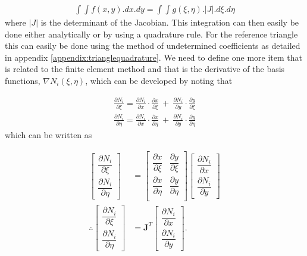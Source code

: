 \documentclass[11pt,letterpaper,titlepage]{article}
\newcommand{\beq}{\begin{equation*}
\begin{aligned}}
\newcommand{\eeq}{\end{aligned}
\end{equation*}}
\begin{document}
\beq 
\int \int f(x,y) .dx.dy = \int \int g (\xi,\eta).|J|.d\xi.d\eta
\eeq 
\newline
where $|J|$ is the determinant of the Jacobian. This integration can then easily be done either analytically or by using a quadrature rule. For the reference triangle this can easily be done using the method of undetermined coefficients as detailed in appendix \ref{appendix:trianglequadrature}.
\newline
\newline 
We need to define one more item that is related to the finite element method and that is the derivative of the basis functions, $\nabla N_i(\xi,\eta)$, which can be developed by noting that

\beq 
\frac{\partial N_i}{\partial \xi} = 
\frac{\partial N_i}{\partial x}\cdot \frac{\partial x}{\partial \xi} \ + \ 
\frac{\partial N_i}{\partial y}\cdot  \frac{\partial y}{\partial \xi}
\eeq 
\beq 
\frac{\partial N_i}{\partial \eta} = 
\frac{\partial N_i}{\partial x}\cdot \frac{\partial x}{\partial \eta} \ + \ 
\frac{\partial N_i}{\partial y}\cdot  \frac{\partial y}{\partial \eta}
\eeq 
\newline
which can be written as

\begingroup
\renewcommand*{\arraystretch}{1.5}
\beq
\begin{bmatrix}
\dfrac{\partial N_i}{\partial \xi} \\
\dfrac{\partial N_i}{\partial \eta}
\end{bmatrix}
&=
\begin{bmatrix}
\dfrac{\partial x}{\partial \xi}   &\dfrac{\partial y}{\partial \xi} \\
\dfrac{\partial x}{\partial \eta}   &\dfrac{\partial y}{\partial \eta} \\
\end{bmatrix}
\begin{bmatrix}
\dfrac{\partial N_i}{\partial x} \\
\dfrac{\partial N_i}{\partial y}
\end{bmatrix} \\
\therefore 
\begin{bmatrix}
\dfrac{\partial N_i}{\partial \xi} \\
\dfrac{\partial N_i}{\partial \eta}
\end{bmatrix}
&= \mathbf{J}^T 
\begin{bmatrix}
\dfrac{\partial N_i}{\partial x} \\
\dfrac{\partial N_i}{\partial y}
\end{bmatrix}.
\eeq 
\endgroup
\end{document}

